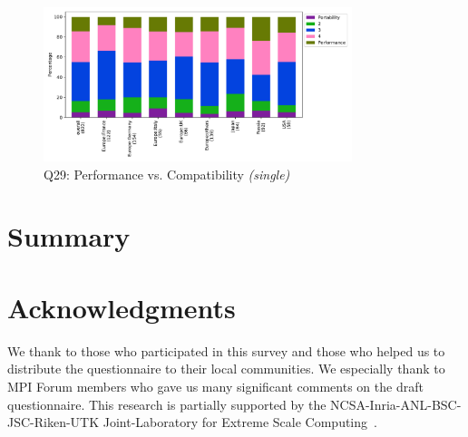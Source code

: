 \documentclass[conference,10pt,letterpaper]{IEEEtran}
\begin{document}
\begin{figure}[htb]
\begin{center}
\includegraphics[width=9cm]{Figs/Q29.pdf}
\caption{Q29: Performance vs. Compatibility {\it(single)}}
\label{fig:performance-vs-compatibility}
\end{center}
\end{figure}

\section{Summary}

\section*{Acknowledgments}
We thank to those who participated in this survey and those who
helped us to distribute the questionnaire to their local
communities. We especially thank to MPI Forum members who gave us many
significant comments on the draft questionnaire.
This research is partially supported by the
NCSA-Inria-ANL-BSC-JSC-Riken-UTK Joint-Laboratory for Extreme Scale
Computing~\cite{JLESC}.



\end{document}
